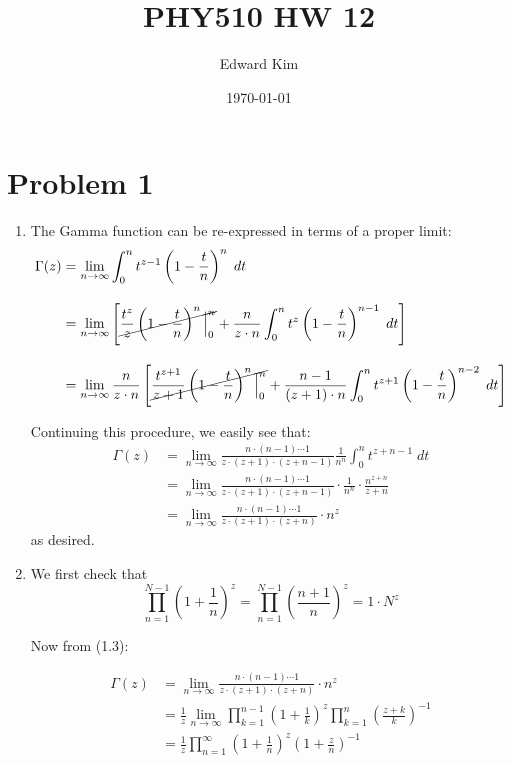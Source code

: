 \documentclass[12pt]{article}%
\title{PHY510 HW 12}
\author{Edward Kim}
\date{\today}
\begin{document}
\maketitle
\section{Problem 1}

\begin{enumerate}
  \item The Gamma function can be re-expressed in terms of a proper limit:
  \begin{align*}
    \Gamma(z) & = \lim_{n \rightarrow \infty} \int_0^n t^{z-1}\left(1 - \frac{t}{n}\right)^n \; dt \\[1em]
    & = \lim_{n \rightarrow \infty}  \left[\cancel{\frac{t^z}{z} \left(1 - \frac{t}{n}\right)^n \Big|_0^n} + \frac{n}{z\cdot n} \int_0^n t^z \left(1-\frac{t}{n}\right)^{n-1} \; dt \right] \\[1em]
    & =  \lim_{n \rightarrow \infty} \frac{n}{z\cdot n} \left[\cancel{\frac{t^{z+1}}{z+1} \left(1 - \frac{t}{n}\right)^n \Big|_0^n} + \frac{n-1}{(z+1)\cdot n} \int_0^n t^{z+1} \left(1 - \frac{t}{n}\right)^{n-2} \; dt\right]
  \end{align*}

  Continuing this procedure, we easily see that:
  \begin{align*}
      \Gamma(z) & = \lim_{n \rightarrow \infty} \frac{n \cdot (n-1) \cdots 1}{z \cdot (z+1) \cdot (z+n-1)} \frac{1}{n^n} \int_0^n t^{z+n-1} \; dt \\[1em]
      & = \lim_{n \rightarrow \infty} \frac{n \cdot (n-1) \cdots 1}{z \cdot (z+1) \cdot (z+n-1)} \cdot \frac{1}{n^n} \cdot \frac{n^{z+n}}{z+n} \\[1em]
      & =  \lim_{n \rightarrow \infty}  \frac{ n \cdot (n-1) \cdots 1}{z \cdot (z+1) \cdot (z+n)} \cdot n^z
  \end{align*}
  as desired.

  \item
  We first check that
  \[ \prod_{n=1}^{N-1} \left(1 + \frac{1}{n}\right)^z = \prod_{n=1}^{N-1} \left(\frac{n+1}{n}\right)^z = 1 \cdot N^z \]

  Now from (1.3):

  \begin{align*}
    \Gamma(z) & = \lim_{n \rightarrow \infty}  \frac{ n \cdot (n-1) \cdots 1}{z \cdot (z+1) \cdot (z+n)} \cdot n^z \\[1em]
    & = \frac{1}{z}\lim_{n \rightarrow \infty}  \prod_{k=1}^{n-1} \left(1 + \frac{1}{k}\right)^z \prod_{k=1}^n \left(\frac{z +k}{k}\right)^{-1} \\[1em]
    & = \frac{1}{z} \prod_{n=1}^\infty \left(1 + \frac{1}{n}\right)^z\left(1 + \frac{z}{n}\right)^{-1}
  \end{align*}


\end{enumerate}
\end{document}
